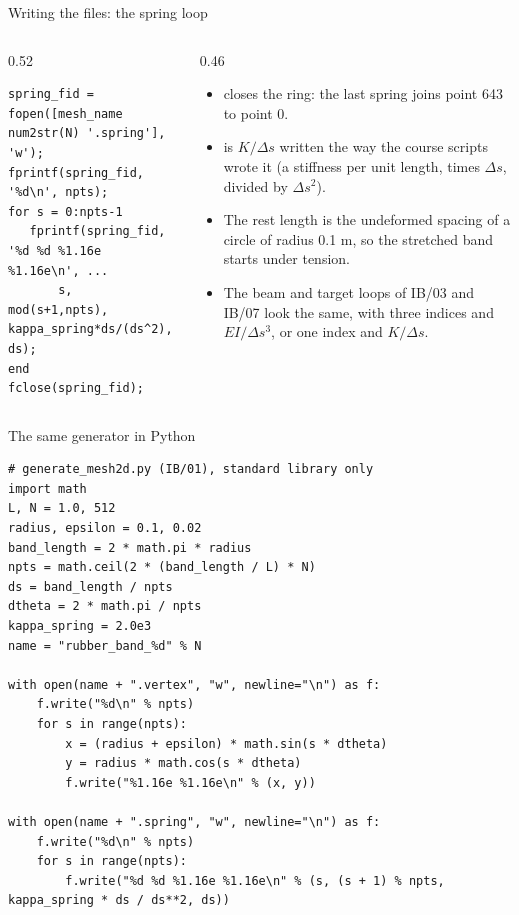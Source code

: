 \documentclass[aspectratio=169,11pt]{beamer}
\begin{document}
\begin{frame}[fragile]{Writing the files: the spring loop}
\begin{columns}[T,onlytextwidth]
\begin{column}{0.52\textwidth}
\begin{lstlisting}[style=matlab,basicstyle=\ttfamily\tiny\color{BlackGray}]
% Write out the spring information
spring_fid = fopen([mesh_name num2str(N) '.spring'], 'w');
fprintf(spring_fid, '%d\n', npts);
for s = 0:npts-1
   fprintf(spring_fid, '%d %d %1.16e %1.16e\n', ...
       s, mod(s+1,npts), kappa_spring*ds/(ds^2), ds);
end
fclose(spring_fid);
\end{lstlisting}
\end{column}
\begin{column}{0.46\textwidth}
\small
\begin{itemize}
  \item {} closes the ring: the last spring joins point 643 to point 0.
  \item {} is $K/\Delta s$ written the way the course scripts wrote it (a stiffness per unit length, times $\Delta s$, divided by $\Delta s^2$).
  \item The rest length is the undeformed spacing of a circle of radius 0.1 m, so the stretched band starts under tension.
  \item The beam and target loops of IB/03 and IB/07 look the same, with three indices and $EI/\Delta s^3$, or one index and $K/\Delta s$.
\end{itemize}
\end{column}
\end{columns}
\end{frame}

\begin{frame}[fragile]{The same generator in Python}
\begin{lstlisting}[style=tiny]
# generate_mesh2d.py (IB/01), standard library only
import math
L, N = 1.0, 512
radius, epsilon = 0.1, 0.02
band_length = 2 * math.pi * radius
npts = math.ceil(2 * (band_length / L) * N)
ds = band_length / npts
dtheta = 2 * math.pi / npts
kappa_spring = 2.0e3
name = "rubber_band_%d" % N

with open(name + ".vertex", "w", newline="\n") as f:
    f.write("%d\n" % npts)
    for s in range(npts):
        x = (radius + epsilon) * math.sin(s * dtheta)
        y = radius * math.cos(s * dtheta)
        f.write("%1.16e %1.16e\n" % (x, y))

with open(name + ".spring", "w", newline="\n") as f:
    f.write("%d\n" % npts)
    for s in range(npts):
        f.write("%d %d %1.16e %1.16e\n" % (s, (s + 1) % npts, kappa_spring * ds / ds**2, ds))
\end{lstlisting}
\end{frame}
\end{document}
